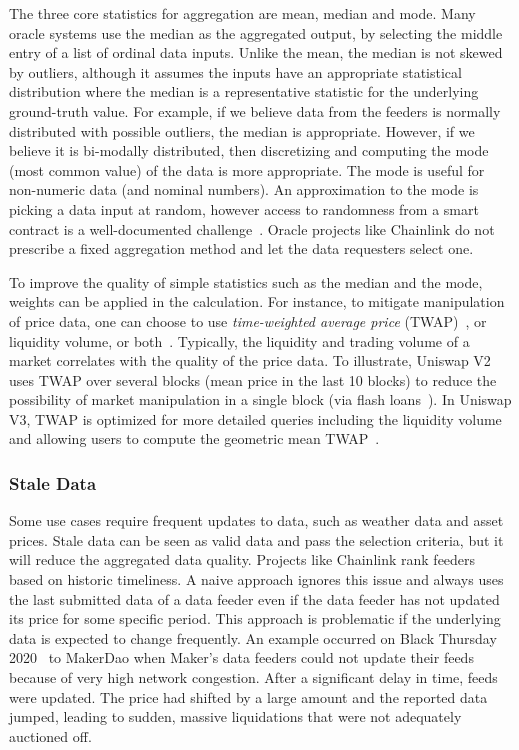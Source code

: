 The three core statistics for aggregation are mean, median and mode. Many oracle systems use the median as the aggregated output, by selecting the middle entry of a list of ordinal data inputs. Unlike the mean, the median is not skewed by  outliers, although it assumes the inputs have an appropriate statistical distribution where the median is a representative statistic for the underlying ground-truth value. For example, if we believe data from the feeders is normally distributed with possible outliers, the median is appropriate. However, if we believe it is bi-modally distributed, then discretizing and computing the mode (most common value) of the data is more appropriate. The mode is useful for non-numeric data (and nominal numbers). An approximation to the mode is picking a data input at random, however access to randomness from a smart contract is a well-documented challenge~\cite{chatterjee2019probabilistic,bunz2017proofs,chainlinkvrf}. Oracle projects like Chainlink do not prescribe a fixed aggregation method and let the data requesters select one.

To improve the quality of simple statistics such as the median and the mode, weights can be applied in the calculation. For instance, to mitigate manipulation of price data, one can choose to use \textit{time-weighted average price} (TWAP)~\cite{uniswaporacle}, or liquidity volume, or both~\cite{adams2021uniswap}. Typically, the liquidity and trading volume of a market correlates with the quality of the price data. To illustrate, Uniswap V2 uses TWAP over several blocks (\eg mean price in the last 10 blocks) to reduce the possibility of market manipulation in a single block (\eg via flash loans~\cite{qin2020attacking}). In Uniswap V3, TWAP is optimized for more detailed queries including the liquidity volume and allowing users to compute the geometric mean TWAP~\cite{adams2021uniswap}.

\subsubsection{Stale Data}

Some use cases require frequent updates to data, such as weather data and asset prices. Stale data can be seen as valid data and pass the selection criteria, but it will reduce the aggregated data quality. Projects like Chainlink rank feeders based on historic timeliness. A naive approach ignores this issue and always uses the last submitted data of a data feeder even if the data feeder has not updated its price for some specific period. This approach is problematic if the underlying data is expected to change frequently. An example occurred on Black Thursday 2020~\cite{blackthursdayMaker} to MakerDao when Maker's data feeders could not update their feeds because of very high network congestion. After a significant delay in time, feeds were updated. The price had shifted by a large amount and the reported data jumped, leading to sudden, massive liquidations that were not adequately auctioned off. 


